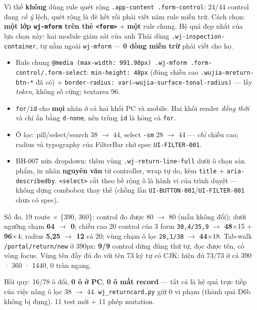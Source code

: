 Vì thế \textbf{không} dùng rule quét rộng \texttt{.app-content .form-control}: 24/44 control đang
\emph{cố ý} lệch, quét rộng là đè hết rồi phải viết năm rule miễn trừ. Cách chọn: \textbf{một lớp
\texttt{wj-mform} trên thẻ \texttt{<form>}} + \textbf{một} rule chung. Hệ quả đẹp nhất của lựa chọn
này: hai module giám sát của anh Thái dùng \texttt{.wj-inspection-container}, tự nằm ngoài
\texttt{wj-mform} --- \textbf{0 dòng miễn trừ} phải viết cho họ.

\begin{itemize}
\item Rule chung \texttt{@media (max-width: 991.98px) .wj-mform .form-control/.form-select}:
  \texttt{min-height: 48px} (đúng chiều cao \texttt{.wujia-mreturn-btn-*} đã có) +
  \texttt{border-radius: var(--wujia-surface-tonal-radius)} --- lấy \emph{token}, không số cứng;
  textarea 96.
\item \texttt{for}/\texttt{id} cho \textbf{mọi} nhãn ở cả hai khối PC và mobile. Hai khối render
  \emph{đồng thời} và chỉ ẩn bằng \texttt{d-none}, nên trùng \texttt{id} là hỏng cả \texttt{for}.
\item Ô lọc: pill/select/search 38 $\to$ 44, select \texttt{-sm} 28 $\to$ 44 --- \emph{chỉ} chiều
  cao; radius và typography của FilterBar chờ spec \texttt{UI-FILTER-001}.
\item BH-007 nửa dropdown: thêm vùng \texttt{.wj-return-line-full} dưới ô chọn sản phẩm, in nhãn
  \textbf{nguyên văn} từ controller, wrap tự do, kèm \texttt{title} + \texttt{aria-describedby}.
  \texttt{<select>} cắt theo bề rộng ô là hành vi của trình duyệt --- không dựng combobox thay thế
  (chồng lấn \texttt{UI-BUTTON-001}/\texttt{UI-FILTER-001} chưa có spec).
\end{itemize}

Số đo, 19 route $\times$ \{390, 360\}: control đo được 80 $\to$ 80 (mẫu không đổi); dưới ngưỡng
chạm \textbf{64 $\to$ 0}; chiều cao 20 control của 3 form \texttt{30,4/35,9} $\to$
\textbf{48}$\times$15 + \textbf{96}$\times$4; radius \textbf{5,25 $\to$ 12} cả 20; vùng chạm ô lọc
\texttt{28,1/38} $\to$ \textbf{44}$\times$18. Tab-walk \texttt{/portal/return/new} ở 390px:
\textbf{9/9} control dừng đúng thứ tự, đọc được tên, có vòng focus. Vùng tên đầy đủ đo với tên 73
ký tự có CJK: hiện đủ 73/73 ở cả 390 · 360 · 1440, 0 tràn ngang.

Hồi quy: 16/78 ô đổi, \textbf{0 ô ở PC}, \textbf{0 ô mất record} --- tất cả là hệ quả trực tiếp của
việc nâng ô lọc 38 $\to$ 44. \texttt{wj\_returncard.py} giữ 0 vi phạm (thành quả D6b không bị đụng).
11 test mới + 11 phép mutation.

